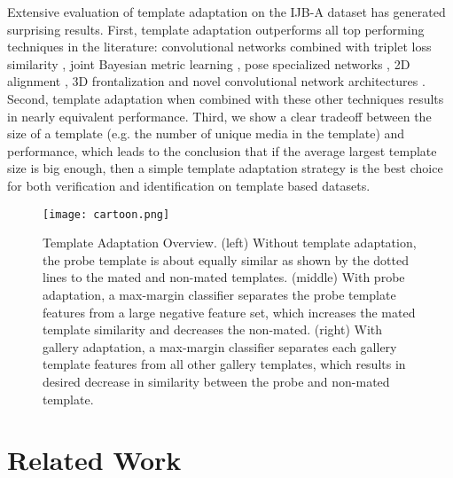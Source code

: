 \documentclass[10pt,twocolumn,letterpaper]{article}
\theoremstyle{definition}		\newtheorem{defn}[thm]{Definition}
\newcommand{\figwidth}{6.85in}
\newcommand{\ARXIV}{}
\begin{document}
Extensive evaluation of template adaptation on the IJB-A dataset has generated surprising results.  First, template adaptation outperforms all top performing techniques in the literature: convolutional networks combined with triplet loss similarity \cite{Schroff15,Parkhi15,Sankaranarayanan16}, joint Bayesian metric learning \cite{Chen16}, pose specialized networks \cite{AbdAlmageed16},  2D alignment \cite{Parkhi15}, 3D frontalization \cite{Taigman14} and novel convolutional network architectures \cite{RoyChowdry16}.  Second, template adaptation when combined with these other techniques results in nearly equivalent performance.  Third, we show a clear tradeoff between the size of a template (e.g. the number of unique media in the template) and performance, which leads to the conclusion that if the average largest template size is big enough, then a simple template adaptation strategy is the best choice for both verification and identification on template based datasets.  


\ifdefined\ARXIV
\begin{figure*}[!t]
\begin{centering}
\texttt{[image: cartoon.png]} 
\caption{Template Adaptation Overview.  (left) Without template adaptation, the probe template is about equally similar as shown by the dotted lines to the mated and non-mated templates.  (middle) With probe adaptation, a max-margin classifier separates the probe template features from a large negative feature set, which increases the mated template similarity and decreases the non-mated.
 (right) With gallery adaptation, a max-margin classifier separates each gallery template features from all other gallery templates, which results in desired decrease in similarity between the probe and non-mated template.  
}
\label{f:cartoon}
\end{centering}
\end{figure*}
 \fi

\section{Related Work}
\end{document}
